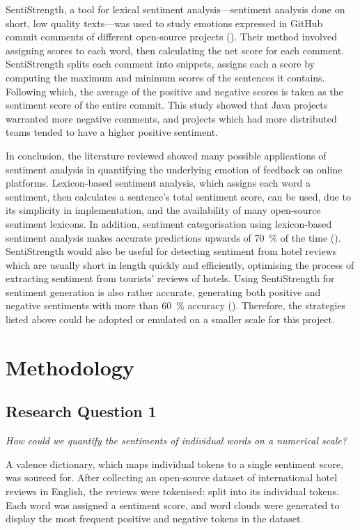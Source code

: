 \documentclass[12pt, bibliography=totocnumbered, paper=a4]{scrartcl}
\def\it#1{\textit{#1}}
\begin{document}
SentiStrength, a tool for lexical sentiment analysis---sentiment analysis done
on short, low quality texts---was used to study emotions expressed in GitHub
commit comments of different open-source projects (\cite{github}).
Their method involved assigning scores to each word, then calculating the net
score for each comment. SentiStrength splits each comment into snippets, assigns
each a score by computing the maximum and minimum scores of the sentences it contains.
Following which, the average of the positive and negative scores is taken as the
sentiment score of the entire commit. This study showed that Java projects warranted
more negative comments, and projects which had more distributed teams tended
to have a higher positive sentiment.

In conclusion, the literature reviewed showed many possible applications
of sentiment analysis in quantifying the underlying emotion of feedback
on online platforms. Lexicon-based sentiment analysis, which assigns each
word a sentiment, then calculates a sentence's total sentiment score, can
be used, due to its simplicity in implementation, and the availability of
many open-source sentiment lexicons. In addition, sentiment categorisation
using lexicon-based sentiment analysis makes accurate predictions upwards of
\qty{70}{\percent} of the time (\cite{khoo}). SentiStrength would also be useful for
detecting sentiment from hotel reviews which are usually short in length quickly
and efficiently, optimising the process of extracting sentiment from tourists'
reviews of hotels. Using SentiStrength for sentiment generation is also
rather accurate, generating both positive and negative sentiments with more
than \qty{60}{\percent} accuracy (\cite{thelwall}). Therefore, the strategies listed %
above could be adopted or emulated on a smaller scale for this project.

\section{Methodology}

\subsection{Research Question 1}
\it{How could we quantify the sentiments of individual words on a numerical scale?}

A valence dictionary, which maps individual tokens to a single
sentiment score, was sourced for. After collecting an open-source dataset
of international hotel reviews in English, the reviews were tokenised:
split into its individual tokens. Each word was assigned a sentiment score,
and word clouds were generated to display the most frequent positive and
negative tokens in the dataset.
\end{document}
